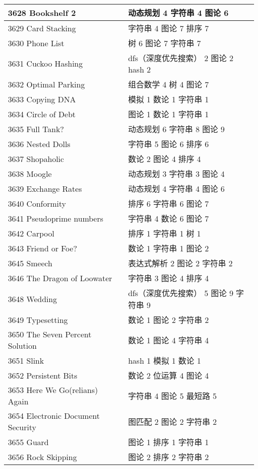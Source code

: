 \begin{longtable}{| p{} | p{} |}
 3628 Bookshelf 2  & 动态规划 4 字符串 4 图论 6 \\ \hline
 3629 Card Stacking  & 字符串 4 图论 7 排序 7 \\ \hline
 3630 Phone List  & 树 6 图论 7 字符串 7 \\ \hline
 3631 Cuckoo Hashing  & dfs（深度优先搜索） 2 图论 2 hash 2 \\ \hline
 3632 Optimal Parking  & 组合数学 4 树 4 图论 7 \\ \hline
 3633 Copying DNA  & 模拟 1 数论 1 字符串 1 \\ \hline
 3634 Circle of Debt  & 图论 1 数论 1 字符串 1 \\ \hline
 3635 Full Tank?  & 动态规划 6 字符串 8 图论 9 \\ \hline
 3636 Nested Dolls  & 字符串 5 图论 6 排序 6 \\ \hline
 3637 Shopaholic  & 数论 2 图论 4 排序 4 \\ \hline
 3638 Moogle  & 动态规划 3 字符串 3 图论 4 \\ \hline
 3639 Exchange Rates  & 动态规划 4 字符串 4 图论 6 \\ \hline
 3640 Conformity  & 排序 6 字符串 6 图论 7 \\ \hline
 3641 Pseudoprime numbers  & 字符串 4 数论 6 图论 7 \\ \hline
 3642 Carpool  & 排序 1 字符串 1 树 1 \\ \hline
 3643 Friend or Foe?  & 数论 1 字符串 1 图论 2 \\ \hline
 3645 Smeech  & 表达式解析 2 图论 2 字符串 2 \\ \hline
 3646 The Dragon of Loowater  & 字符串 3 图论 4 排序 4 \\ \hline
 3648 Wedding  & dfs（深度优先搜索） 5 图论 9 字符串 9 \\ \hline
 3649 Typesetting  & 数论 1 图论 2 字符串 2 \\ \hline
 3650 The Seven Percent Solution  & 数论 1 图论 4 字符串 4 \\ \hline
 3651 Slink  & hash 1 模拟 1 数论 1 \\ \hline
 3652 Persistent Bits  & 数论 2 位运算 4 图论 4 \\ \hline
 3653 Here We Go(relians) Again  & 字符串 4 图论 5 最短路 5 \\ \hline
 3654 Electronic Document Security  & 图匹配 2 图论 2 字符串 2 \\ \hline
 3655 Guard  & 图论 1 排序 1 字符串 1 \\ \hline
 3656 Rock Skipping  & 图论 2 排序 2 字符串 2 \\ \hline

\end{longtable}
